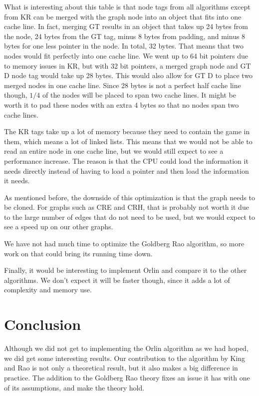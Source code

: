 What is interesting about this table is that node tags from all algorithms except from KR can be merged with the graph node into an object that fits into one cache line.
In fact, merging GT results in an object that takes up 24 bytes from the node, 24 bytes from the GT tag, minus 8 bytes from padding, and minus 8 bytes for one less pointer in the node.
In total, 32 bytes. That means that two nodes would fit perfectly into one cache line. 
We went up to 64 bit pointers due to memory issues in KR, but with 32 bit pointers, a merged graph node and GT D node tag would take up 28 bytes.
This would also allow for GT D to place two merged nodes in one cache line.
Since 28 bytes is not a perfect half cache line though, $1/4$ of the nodes will be placed to span two cache lines.
It might be worth it to pad these nodes with an extra 4 bytes so that no nodes span two cache lines.

The KR tags take up a lot of memory because they need to contain the game in them, which means a lot of linked lists.
This means that we would not be able to read an entire node in one cache line, but we would still expect to see a performance increase.
The reason is that the CPU could load the information it needs directly instead of having to load a pointer and then load the information it needs.

As mentioned before, the downside of this optimization is that the graph needs to be cloned. 
For graphs such as CRE and CRH, that is probably not worth it due to the large number of edges that do not need to be used, but we would expect to see a speed up on our other graphs.

We have not had much time to optimize the Goldberg Rao algorithm, so more work on that could bring its running time down.

Finally, it would be interesting to implement Orlin and compare it to the other algorithms. 
We don't expect it will be faster though, since it adds a lot of complexity and memory use.

\section{Conclusion}

Although we did not get to implementing the Orlin algorithm \cite{Orlin13} as we had hoped, we did get some interesting results.
Our contribution to the algorithm by King and Rao is not only a theoretical result, but it also makes a big difference in practice.
The addition to the Goldberg Rao theory fixes an issue it has with one of its assumptions, and make the theory hold.

